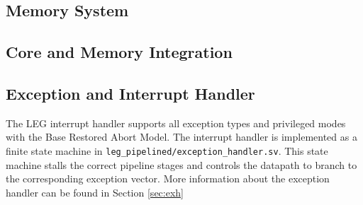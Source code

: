 \subsection{Memory System}

\subsection{Core and Memory Integration}

\subsection{Exception and Interrupt Handler}

The LEG interrupt handler supports all exception types and privileged modes with the Base Restored Abort Model.
The interrupt handler is implemented as a finite state machine in \texttt{leg\_pipelined/exception\_handler.sv}.
This state machine stalls the correct pipeline stages and controls the datapath to branch to the corresponding exception vector.
More information about the exception handler can be found in Section \ref{sec:exh}
